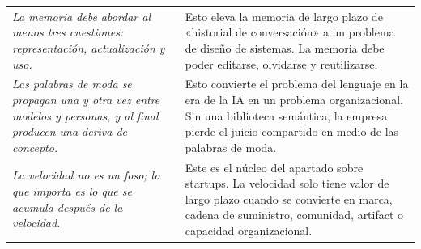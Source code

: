 \begin{longtable}{>{\raggedright\arraybackslash}p{} >{\raggedright\arraybackslash}p{}}
\textit{La memoria debe abordar al menos tres cuestiones: representación, actualización y uso.} & Esto eleva la memoria de largo plazo de «historial de conversación» a un problema de diseño de sistemas. La memoria debe poder editarse, olvidarse y reutilizarse. \\
\textit{Las palabras de moda se propagan una y otra vez entre modelos y personas, y al final producen una deriva de concepto.} & Esto convierte el problema del lenguaje en la era de la IA en un problema organizacional. Sin una biblioteca semántica, la empresa pierde el juicio compartido en medio de las palabras de moda. \\
\textit{La velocidad no es un foso; lo que importa es lo que se acumula después de la velocidad.} & Este es el núcleo del apartado sobre startups. La velocidad solo tiene valor de largo plazo cuando se convierte en marca, cadena de suministro, comunidad, artifact o capacidad organizacional. \\
\bottomrule
\end{longtable}


